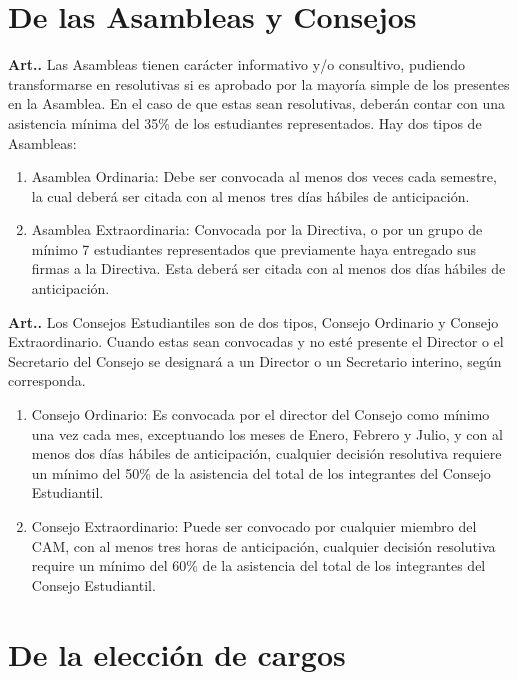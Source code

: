 \documentclass[letterpaper,11pt]{article}
\newcounter{art}
\newenvironment{art}{\refstepcounter{art}\textbf{Art.{\space}\theart.}}{}
\begin{document}
\section{De las Asambleas y Consejos}\label{asambleasConsejos}
\begin{art}\label{asambleas}
    Las Asambleas tienen carácter informativo y/o consultivo, pudiendo transformarse en resolutivas si es aprobado por la mayoría simple de los presentes en la Asamblea. En el caso de que estas sean resolutivas, deberán contar con una asistencia mínima del 35\% de los estudiantes representados. Hay dos tipos de Asambleas:
    \begin{enumerate}
        \item Asamblea Ordinaria: Debe ser convocada al menos dos veces cada semestre, la cual deberá ser citada con al menos tres días hábiles de anticipación.
        \item Asamblea Extraordinaria: Convocada por la Directiva, o por un grupo de mínimo 7 estudiantes representados que previamente haya entregado sus firmas a la Directiva. Esta deberá ser citada con al menos dos días hábiles de anticipación.
    \end{enumerate}
\end{art}

\begin{art}\label{consejos}
    Los Consejos Estudiantiles son de dos tipos, Consejo Ordinario y Consejo Extraordinario. Cuando estas sean convocadas y no esté presente el Director o el Secretario del Consejo se designará a un Director o un Secretario interino, según corresponda.
    \begin{enumerate}
        \item Consejo Ordinario: Es convocada por el director del Consejo como mínimo una vez cada mes, exceptuando los meses de Enero, Febrero y Julio, y con al menos dos días hábiles de anticipación, cualquier decisión resolutiva requiere un mínimo del 50\% de la asistencia del total de los integrantes del Consejo Estudiantil.
        \item Consejo Extraordinario: Puede ser convocado por cualquier miembro del CAM, con al menos tres horas de anticipación, cualquier decisión resolutiva require un mínimo del 60\% de la asistencia del total de los integrantes del Consejo Estudiantil.
    \end{enumerate}
\end{art}

\section{De la elección de cargos}\label{elecciones}
\end{document}
